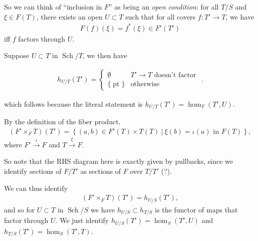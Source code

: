 So we can think of ``inclusion in \(F\)'' as being an \emph{open
condition}: for all \(T/S\) and \(\xi \in F(T)\), there exists an open
\(U \subset T\) such that for all covers \(f: T' \to T\), we have
\begin{align*}
F(f)(\xi) = f^*(\xi) \in F'(T')
\end{align*}
iff \(f\) factors through \(U\).

Suppose \(U \subset T\) in \({\operatorname{Sch}}/T\), we then have

\begin{align*} h_{U/T}(T') = \begin{cases} \emptyset & T' \to T \text{ doesn't factor } \\ {\{\operatorname{pt}\}}& \text{otherwise} \end{cases} .\end{align*}

which follows because the literal statement is
\(h_{U/T}(T') = \hom_T(T', U)\).

By the definition of the fiber product,
\begin{align*}
(F' \times_F T)(T') = \left\{{ (a,b) \in F'(T) \times T(T) {~\mathrel{\Big|}~}\xi(b) = \iota(a) \text{ in  } F(T)}\right\}
,\end{align*}
where \(F' \xrightarrow{\iota} F\) and \(T \xrightarrow{\xi} F\).

So note that the RHS diagram here is exactly given by pullbacks, since
we identify sections of \(F/T'\) as sections of \(F\) over \(T/T'\) (?).

\begin{center}
\end{center}

We can thus identify
\begin{align*}
(F' \times_F T)(T') = h_{U/S}(T')
,\end{align*}
and so for \(U \subset T\) in \({\operatorname{Sch}}/S\) we have
\(h_{U/S} \subset h_{T/S}\) is the functor of maps that factor through
\(U\). We just identify \(h_{U/S}(T') = \hom_S(T', U)\) and
\(h_{T/S}(T') = \hom_S(T', T)\).

